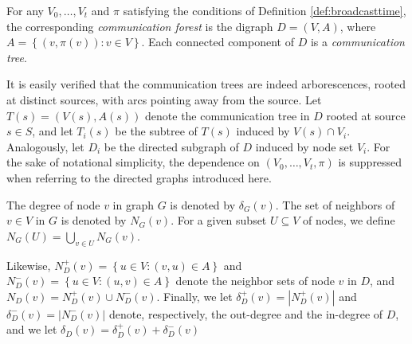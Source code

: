 \begin{definition} \label{def:broadcastgraph}
For any $V_0,\ldots,V_t$ and $\pi$ satisfying the conditions of Definition \ref{def:broadcasttime},
the corresponding \emph{communication forest} is
the digraph $D=(V,A)$, where $A=\left\{\left(v,\pi(v)\right): v\in V\right\}$.
Each connected component of $D$ is a \emph{communication tree}.
\end{definition}

\noindent
It is easily verified that the communication trees are indeed arborescences, rooted at distinct sources, with arcs pointing away from the source.
Let $T(s)=\left(V(s),A(s)\right)$ denote the communication tree in $D$ rooted at source $s\in S$,
and let $T_i(s)$ be the subtree of $T(s)$ induced by $V(s)\cap V_i$.
Analogously, let $D_i$ be the directed subgraph of $D$ induced by node set $V_i$.
For the sake of notational simplicity, the dependence on $(V_0,\ldots,V_t,\pi)$ is suppressed when referring to the directed graphs introduced here.

The degree of node $v$ in graph $G$ is denoted by $\delta_G(v)$.
The set of neighbors of $v\in V$ in $G$ is denoted by $N_G(v)$.
For a given subset $U\subseteq V$ of nodes, we define $N_G(U)=\bigcup_{v\in U}N_G(v)$.

Likewise, $N_D^+(v)=\left\{u\in V:(v,u)\in A\right\}$ and $N_D^-(v)=\left\{u\in V:(u,v)\in A\right\}$ denote the neighbor sets of node $v$ in $D$,
and $N_D(v)=N_D^+(v)\cup N_D^-(v)$.
Finally, we let $\delta^+_D(v)=\left|N_D^+(v)\right|$ and $\delta^-_D(v)=\left|N_D^-(v)\right|$ denote, respectively, the out-degree and the in-degree of $D$,
and we let $\delta_D(v)=\delta_D^+(v)+\delta_D^-(v)$

